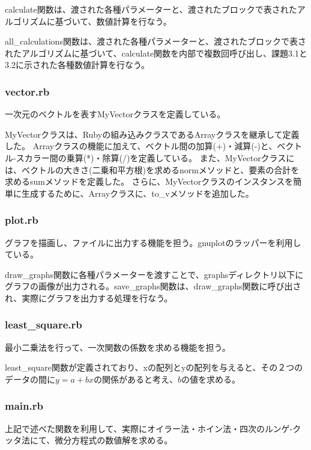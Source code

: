 \documentclass[11pt]{jsarticle}
\begin{document}
                calculate関数は、渡された各種パラメーターと、渡されたブロックで表されたアルゴリズムに基づいて、数値計算を行なう。

                all\_calculations関数は、渡された各種パラメーターと、渡されたブロックで表されたアルゴリズムに基づいて、calculate関数を内部で複数回呼び出し、課題3.1と3.2に示された各種数値計算を行なう。

            \subsubsection*{vector.rb}
                一次元のベクトルを表すMyVectorクラスを定義している。

                MyVectorクラスは、Rubyの組み込みクラスであるArrayクラスを継承して定義した。
                Arrayクラスの機能に加えて、ベクトル間の加算(+)・減算(-)と、ベクトル-スカラー間の乗算(*)・除算(/)を定義している。
                また、MyVectorクラスには、ベクトルの大きさ(二乗和平方根)を求めるnormメソッドと、要素の合計を求めるsumメソッドを定義した。
                さらに、MyVectorクラスのインスタンスを簡単に生成するために、Arrayクラスに、to\_vメソッドを追加した。

            \subsubsection*{plot.rb}
                グラフを描画し、ファイルに出力する機能を担う。gnuplotのラッパーを利用している。

                draw\_graphs関数に各種パラメーターを渡すことで、graphsディレクトリ以下にグラフの画像が出力される。save\_graphs関数は、draw\_graphs関数に呼び出され、実際にグラフを出力する処理を行なう。

            \subsubsection*{least\_square.rb}
                最小二乗法を行って、一次関数の係数を求める機能を担う。

                least\_square関数が定義されており、xの配列とyの配列を与えると、その２つのデータの間に$y=a+bx$の関係があると考え、$b$の値を求める。

            \subsubsection*{main.rb}
                上記で述べた関数を利用して、実際にオイラー法・ホイン法・四次のルンゲ-クッタ法にて、微分方程式の数値解を求める。
\end{document}
